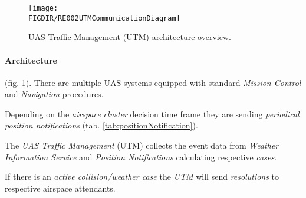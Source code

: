 \begin{figure}[H]
    \centering
    \texttt{[image: \\FIGDIR/RE002UTMCommunicationDiagram]} 
    \caption{UAS Traffic Management (UTM) architecture overview.}
    \label{fig:UTMArchitectureOverview}
\end{figure}

\paragraph{Architecture} (fig. \ref{fig:UTMArchitectureOverview}).  There are multiple UAS systems equipped with standard \emph{Mission Control} and \emph{Navigation} procedures. 

Depending on the \emph{airspace cluster} decision time frame they are sending \emph{periodical position notifications} (tab. \ref{tab:positionNotification}).

The \emph{UAS Traffic Management} (UTM) collects the event data from \emph{Weather Information Service} and \emph{Position Notifications} calculating respective \emph{cases}. 

If there is an \emph{active collision/weather case} the \emph{UTM} will send \emph{resolutions} to respective airspace attendants. 